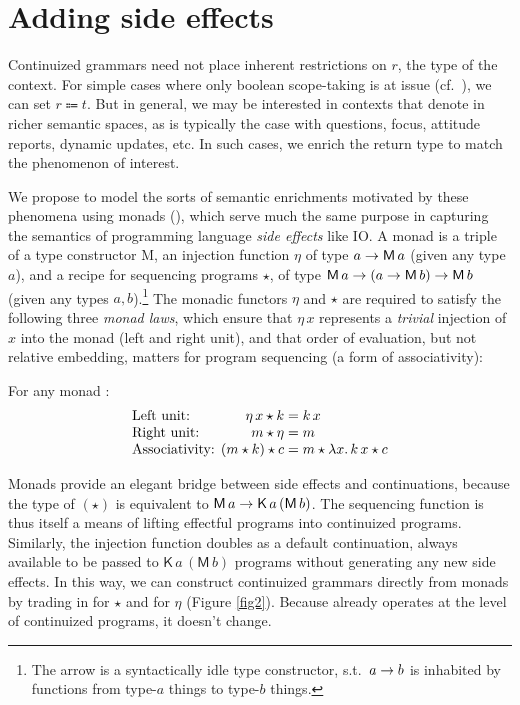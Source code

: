 \section{Adding side effects}
  Continuized grammars need not place inherent restrictions on $r$, the type of the context. For simple cases where only boolean scope-taking is at issue (cf.~\citealt{BarwiseCooper:1981}), we can set $r \Coloneqq t$. But in general, we may be interested in contexts that denote in richer semantic spaces, as is typically the case with questions, focus, attitude reports, dynamic updates, etc. In such cases, we enrich the return type to match the phenomenon of interest. %

  We propose to model the sorts of semantic enrichments motivated by these phenomena using monads (\citealt{Wadler:1994, Liangetal}), which serve much the same purpose in capturing the semantics of programming language \emph{side effects} like IO\@. A monad is a triple  of a type constructor \textsf{M}, an injection function $\eta$ of type $a \rightarrow \textsf{M}\,a$ (given any type $a$), and a recipe for sequencing programs $\star$, of type $\textsf{M}\,a \rightarrow (a \rightarrow \textsf{M}\,b) \rightarrow \textsf{M}\,b$ (given any types $a,b$).\footnote{The arrow is a syntactically idle type constructor, s.t.~$a \rightarrow b$ is inhabited by functions from type-$a$ things to type-$b$ things.} The monadic functors $\eta$ and $\star$ are required to satisfy the following three \emph{monad laws}, which ensure that $\eta\,x$ represents a \emph{trivial} injection of $x$ into the monad (left and right unit), and that order of evaluation, but not relative embedding, matters for program sequencing (a form of associativity): %
	\begin{defi}%
		\label{defi:mlaw}
		For any monad :
		\[\begin{array}{l@{}r@{}l}
			\text{Left unit: }&\eta\,x \star k &{}= k\,x
			\\
			\text{Right unit: }&m \star \eta &{}= m
			\\
			\text{Associativity: }&(m \star k) \star c &{}= m \star \lambda x.\,k\,x \star c%
		\end{array}\]
	\end{defi}
	
  Monads provide an elegant bridge between side effects and continuations, because the type of $(\star)$ is equivalent to $\textsf{M}\,a \rightarrow \textsf{K}\,a\,(\textsf{M}\,b)$. The sequencing function is thus itself a means of lifting effectful programs into continuized programs. Similarly, the injection function doubles as a default continuation, always available to be passed to $\textsf{K}\,a\,(\textsf{M}\,b)$ programs without generating any new side effects. In this way, we can construct continuized grammars directly from monads by trading in  for $\star$ and  for $\eta$ (Figure \ref{fig2}). Because  already operates at the level of continuized programs, it doesn't change.%
	
